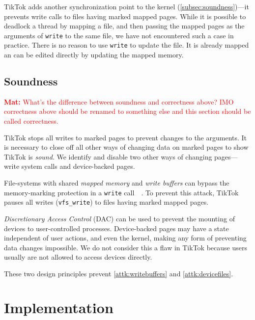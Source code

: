 \documentclass[conference]{IEEEtran}
\newcommand{\mat}[1]{\textcolor{red}{\textbf{Mat:} #1}}
\newcommand{\sysname}{TikTok}
\begin{document}
\sysname{} adds another synchronization point to the kernel
(\autoref{subsec:soundness})---it prevents write calls to files having marked
mapped pages. While it is possible to deadlock a thread by mapping a file, and
then passing the mapped pages as the arguments of \texttt{write} to the same
file, we have not encountered such a case in practice. There is no reason to use
\texttt{write} to update the file. It is already mapped an can be edited
directly by updating the mapped memory.

\subsection{Soundness}
\label{subsec:soundness}
\mat{What's the difference between soundness and correctness above? IMO
correctness above should be renamed to something else and this section should be
called correctness.}

\sysname{} stops all writes to marked pages to prevent changes to the arguments.
It is necessary to close off all other ways of changing data on marked pages to
show \sysname{} is \emph{sound}. We identify and disable two other ways of
changing pages---write system calls and device-backed pages.

File-systems with shared
\emph{mapped memory} and \emph{write buffers} can bypass the memory-marking
protection in a \texttt{write} call~~\cite{watson2007exploiting}. To prevent
this attack, \sysname{} pauses
all writes (\texttt{vfs\_write}) to files having marked mapped pages.

\emph{Discretionary Access Control} (DAC) can be used to prevent the mounting of
devices to user-controlled processes. Device-backed pages may have a state
independent of user actions, and even the kernel, making any form of preventing
data changes impossible. We do not consider this a flaw in \sysname{} because
users usually are not allowed to access devices directly.

These two design principles prevent \autoref{attk:writebuffers} and
\autoref{attk:devicefiles}.


\section{Implementation}
\label{sec:implementation}
\end{document}
